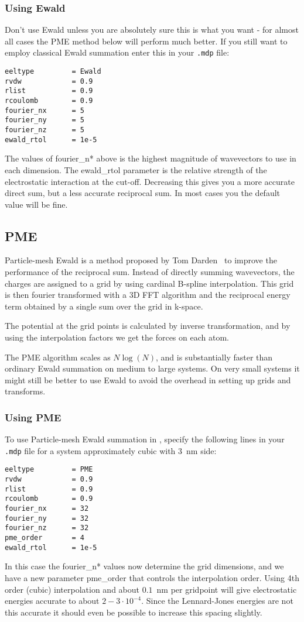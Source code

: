 \subsubsection{Using Ewald}
Don't use Ewald unless you are absolutely sure this is what you want - 
for almost all cases the PME method below will perform much better. 
If you still want to employ classical Ewald summation enter this in
your {\tt .mdp} file:
\begin{verbatim}
eeltype         = Ewald
rvdw            = 0.9
rlist           = 0.9
rcoulomb        = 0.9
fourier_nx      = 5
fourier_ny      = 5
fourier_nz      = 5
ewald_rtol      = 1e-5
\end{verbatim}
The values of fourier\_n* above is the highest magnitude of wavevectors
to use in each dimension. The ewald\_rtol parameter is the relative
strength of the electrostatic interaction at the cut-off. Decreasing
this gives you a more accurate direct sum, but a less accurate
reciprocal sum. In most cases you the default value will be fine.
 
\subsection{PME}
\label{sec:pme}
Particle-mesh Ewald is a method proposed by Tom
Darden~\cite{Darden93,Essmann95} to improve the performance of the
reciprocal sum. Instead of directly summing wavevectors, the charges
are assigned to a grid by using cardinal B-spline interpolation. This
grid is then fourier transformed with a 3D FFT algorithm and 
the reciprocal energy term obtained by a single sum over the grid in k-space.

The potential at the grid points is calculated by inverse
transformation, and by using the interpolation factors we get the
forces on each atom. 

The PME algorithm scales as $N \log(N)$, and is substantially faster
than ordinary Ewald summation on medium to large systems. On very
small systems it might still be better to use Ewald to avoid the
overhead in setting up grids and transforms.

\subsubsection{Using PME}
To use Particle-mesh Ewald summation in {\gromacs}, specify the
following lines in your {\tt .mdp} file for a system approximately
cubic with $3$~nm side:
\begin{verbatim}
eeltype         = PME
rvdw            = 0.9
rlist           = 0.9
rcoulomb        = 0.9
fourier_nx      = 32
fourier_ny      = 32
fourier_nz      = 32
pme_order       = 4
ewald_rtol      = 1e-5
\end{verbatim}
In this case the fourier\_n* values now determine the grid dimensions, 
and we have a new parameter pme\_order that controls the interpolation
order. Using 4th order (cubic) interpolation and about $0.1$~nm per
gridpoint 
will give electrostatic energies accurate to about $2-3\cdot10^{-4}$. Since
the Lennard-Jones energies are not this accurate it should even be possible 
to increase this spacing slightly.


